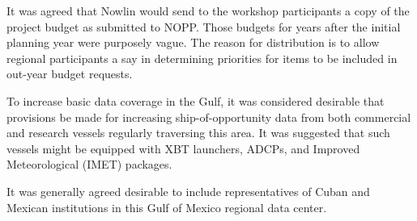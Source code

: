 It was agreed that Nowlin would send to the workshop participants a copy of the project budget 
as submitted to NOPP. Those budgets for years after the initial planning year were purposely 
vague. The reason for distribution is to allow regional participants a say in determining priorities 
for items to be included in out-year budget requests.

To increase basic data coverage in the Gulf, it was considered desirable that provisions be made 
for increasing ship-of-opportunity data from both commercial and research vessels regularly 
traversing this area. It was suggested that such vessels might be equipped with XBT launchers, 
ADCPs, and Improved Meteorological (IMET) packages.

It was generally agreed desirable to include representatives of Cuban and Mexican institutions in 
this Gulf of Mexico regional data center.


